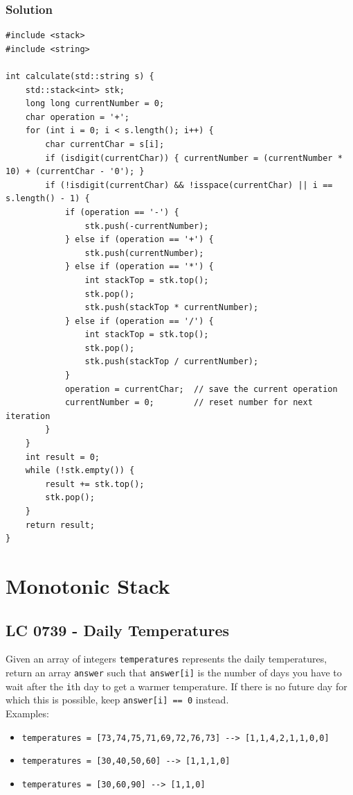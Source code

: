 \subsection*{Solution}
\begin{lstlisting}
#include <stack>
#include <string>

int calculate(std::string s) {
	std::stack<int> stk;
	long long currentNumber = 0;
	char operation = '+';
	for (int i = 0; i < s.length(); i++) {
		char currentChar = s[i];
		if (isdigit(currentChar)) { currentNumber = (currentNumber * 10) + (currentChar - '0'); }
		if (!isdigit(currentChar) && !isspace(currentChar) || i == s.length() - 1) {
			if (operation == '-') {
				stk.push(-currentNumber);
			} else if (operation == '+') {
				stk.push(currentNumber);
			} else if (operation == '*') {
				int stackTop = stk.top();
				stk.pop();
				stk.push(stackTop * currentNumber);
			} else if (operation == '/') {
				int stackTop = stk.top();
				stk.pop();
				stk.push(stackTop / currentNumber);
			}
			operation = currentChar;  // save the current operation
			currentNumber = 0;        // reset number for next iteration
		}
	}
	int result = 0;
	while (!stk.empty()) {
		result += stk.top();
		stk.pop();
	}
	return result;
}
\end{lstlisting}

\chapter{Monotonic Stack}

\section{LC 0739 - Daily Temperatures}
Given an array of integers {\colorbox{CodeBackground}{\lstinline|temperatures|}} represents the daily temperatures, return an array {\colorbox{CodeBackground}{\lstinline|answer|}} such that {\colorbox{CodeBackground}{\lstinline|answer[i]|}} is the number of days you have to wait after the {\colorbox{CodeBackground}{\lstinline|i|}}th day to get a warmer temperature. If there is no future day for which this is possible, keep {\colorbox{CodeBackground}{\lstinline|answer[i] == 0|}} instead.\\

Examples:
\begin{itemize}
\item {\colorbox{CodeBackground}{\lstinline|temperatures = [73,74,75,71,69,72,76,73] --> [1,1,4,2,1,1,0,0]|}}
\item {\colorbox{CodeBackground}{\lstinline|temperatures = [30,40,50,60] --> [1,1,1,0]|}}
\item {\colorbox{CodeBackground}{\lstinline|temperatures = [30,60,90] --> [1,1,0]|}}
\end{itemize}

